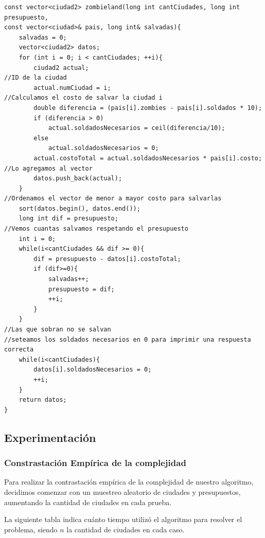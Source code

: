 	
	\begin{codesnippet}
	\begin{verbatim}
const vector<ciudad2> zombieland(long int cantCiudades, long int presupuesto, 
const vector<ciudad>& pais, long int& salvadas){
    salvadas = 0;
    vector<ciudad2> datos;
    for (int i = 0; i < cantCiudades; ++i){
        ciudad2 actual;
//ID de la ciudad
        actual.numCiudad = i;
//Calculamos el costo de salvar la ciudad i
        double diferencia = (pais[i].zombies - pais[i].soldados * 10);
        if (diferencia > 0)
            actual.soldadosNecesarios = ceil(diferencia/10);
        else
            actual.soldadosNecesarios = 0;
        actual.costoTotal = actual.soldadosNecesarios * pais[i].costo;
//Lo agregamos al vector
        datos.push_back(actual);
    }
//Ordenamos el vector de menor a mayor costo para salvarlas
    sort(datos.begin(), datos.end());
    long int dif = presupuesto;
//Vemos cuantas salvamos respetando el presupuesto
    int i = 0;
    while(i<cantCiudades && dif >= 0){
        dif = presupuesto - datos[i].costoTotal;
        if (dif>=0){
            salvadas++;
            presupuesto = dif;
            ++i;
        }
    }
//Las que sobran no se salvan
//seteamos los soldados necesarios en 0 para imprimir una respuesta correcta
    while(i<cantCiudades){
        datos[i].soldadosNecesarios = 0;
        ++i;
    }
    return datos;
}
	\end{verbatim}
	\end{codesnippet}
\newpage
\subsection{Experimentaci\'on}

\subsubsection{Constrastaci\'on Emp\'irica de la complejidad}

Para realizar la contrastaci\'on emp\'irica de la complejidad de nuestro algoritmo, decidimos comenzar con un muestreo aleatorio de ciudades y presupuestos, aumentando la cantidad de ciudades en cada prueba.

La siguiente tabla indica cu\'anto tiempo utiliz\'o el algoritmo para resolver el problema, siendo $n$ la cantidad de ciudades en cada caso.


